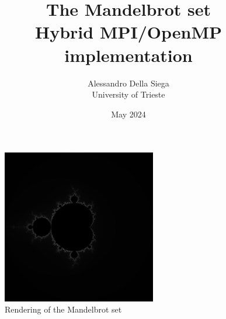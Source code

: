 \documentclass[12pt]{article}
\author{Alessandro Della Siega \\ University of Trieste}
\date{May 2024}
\title{The Mandelbrot set \\ Hybrid MPI/OpenMP implementation}
\begin{document}
\maketitle

\begin{figure}[h!]
\centering
\includegraphics[width=0.6\textwidth]{../images/mandelbrot.png}
\caption{Rendering of the Mandelbrot set}
\end{figure}






\end{document}
